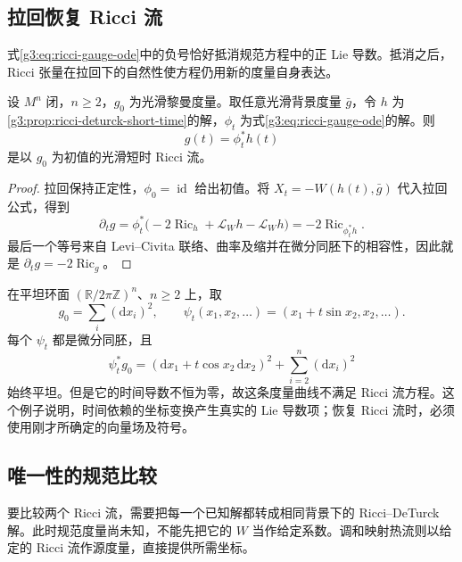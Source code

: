 \subsection{拉回恢复 Ricci 流}
\label{g3:subsec:2702:03}
式\eqref{g3:eq:ricci-gauge-ode}中的负号恰好抵消规范方程中的正 Lie 导数。抵消之后，Ricci 张量在拉回下的自然性使方程仍用新的度量自身表达。

\begin{proposition}\label{g3:prop:ricci-flow-existence}
 设 \(M^n\) 闭，\(n\ge2\)，\(g_0\) 为光滑黎曼度量。取任意光滑背景度量 \(\bar g\)，令 \(h\) 为\cref{g3:prop:ricci-deturck-short-time}的解，\(\phi_t\) 为式\eqref{g3:eq:ricci-gauge-ode}的解。则
 \begin{equation}\label{g3:eq:ricci-flow-from-deturck}
  g(t)=\phi_t^*h(t)
 \end{equation}
 是以 \(g_0\) 为初值的光滑短时 Ricci 流。
\end{proposition}
\begin{proof}
 拉回保持正定性，\(\phi_0=\operatorname{id}\) 给出初值。将 \(X_t=-W(h(t),\bar g)\) 代入拉回公式，得到
 \[
  \partial_tg
  =\phi_t^*\bigl(-2\operatorname{Ric}_h
       +\mathcal L_Wh-\mathcal L_Wh\bigr)
  =-2\operatorname{Ric}_{\phi_t^*h}.
 \]
 最后一个等号来自 Levi--Civita 联络、曲率及缩并在微分同胚下的相容性，因此就是 \(\partial_tg=-2\operatorname{Ric}_g\)。
\end{proof}

\begin{example}\label{g3:exm:ricci-time-dependent-flat-pullback}
 在平坦环面 \((\mathbb R/2\pi\mathbb Z)^n\)、\(n\ge2\) 上，取
 \[
  g_0=\sum_i(\mathrm dx_i)^2,\qquad
  \psi_t(x_1,x_2,\ldots)=(x_1+t\sin x_2,x_2,\ldots).
 \]
 每个 \(\psi_t\) 都是微分同胚，且
 \[
  \psi_t^*g_0=(\mathrm dx_1+t\cos x_2\,\mathrm dx_2)^2
       +\sum_{i=2}^n(\mathrm dx_i)^2
 \]
 始终平坦。但是它的时间导数不恒为零，故这条度量曲线不满足 Ricci 流方程。这个例子说明，时间依赖的坐标变换产生真实的 Lie 导数项；恢复 Ricci 流时，必须使用刚才所确定的向量场及符号。
\end{example}

\subsection{唯一性的规范比较}
\label{g3:subsec:2702:04}
要比较两个 Ricci 流，需要把每一个已知解都转成相同背景下的 Ricci--DeTurck 解。此时规范度量尚未知，不能先把它的 \(W\) 当作给定系数。调和映射热流则以给定的 Ricci 流作源度量，直接提供所需坐标。


